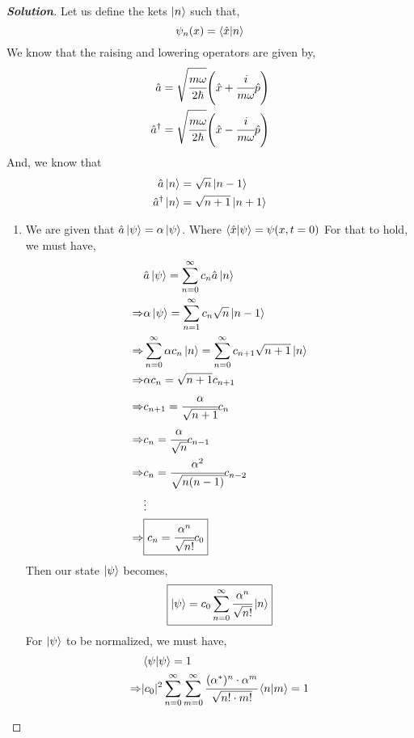 \documentclass[10pt]{scrartcl}
\theoremstyle{definition}
\newenvironment{solution} {\begin{proof}[\normalfont \textbf{Solution}]} {\end{proof}}
\newcommand*{\Op}{\hat{p}}
\newcommand*{\Ox}{\hat{x}}
\newcommand*{\Oa}{\hat{a}}
\begin{document}
\begin{solution}
    Let us define the kets $\ket{n}$ such that, $$\psi_n(x) = \ip{\Ox}{n}$$ We know that the raising
    and lowering operators are given by,
    \begin{align*}
        \Oa &= \sqrt{\cfrac{m\omega}{2\hbar}}\qty(\Ox + \cfrac{i}{m\omega}\Op) \\
        \Oa^\dagger &= \sqrt{\cfrac{m\omega}{2\hbar}}\qty(\Ox - \cfrac{i}{m\omega}\Op)
    \end{align*}
    And, we know that 
    \begin{align*}
        \Oa \ket{n} &= \sqrt{n}\ket{n - 1} \\
        \Oa^\dagger \ket{n} &= \sqrt{n + 1}\ket{n + 1}
    \end{align*}
    \begin{enumerate}[label=(\alph*)]
        \item We are given that $\Oa \ket{\psi} = \alpha \ket{\psi}$. Where $\ip{\Ox}{\psi} = \psi(x, t = 0)$ For that to hold, we must have, 
            \begin{align*}
                &\Oa\ket{\psi} = \sum_{n = 0}^{\infty} c_n \Oa \ket{n} \\
                \Rightarrow &\alpha \ket{\psi} = \sum_{n = 1}^{\infty} c_n \sqrt{n} \ket{n - 1} \\
                \Rightarrow &\sum_{n = 0}^{\infty} \alpha c_n \ket{n} = \sum_{n = 0}^{\infty} c_{n + 1} \sqrt{n + 1} \ket{n} \\ 
                \Rightarrow &\alpha c_n = \sqrt{n + 1} c_{n + 1} \\
                \Rightarrow &c_{n + 1} = \cfrac{\alpha}{\sqrt{n + 1}} c_{n}\\
                \Rightarrow &c_{n} = \cfrac{\alpha}{\sqrt{n}}c_{n - 1} \\
                \Rightarrow &c_{n} = \cfrac{\alpha^2}{\sqrt{n(n-1)}} c_{n - 2}\\
                            &\vdots \\
                \Rightarrow &\boxed{c_n = \cfrac{\alpha^n}{\sqrt{n!}}c_0}
            \end{align*}
            Then our state $\ket{\psi}$ becomes, $$\boxed{\ket{\psi} = c_0 \sum_{n = 0}^{\infty} \cfrac{\alpha^n}{\sqrt{n!}} \ket{n}}$$
            For $\ket\psi$ to be normalized, we must have,
            \begin{align*}
                &\ip{\psi}{\psi} = 1 \\ 
                \Rightarrow &|c_0|^2 \sum_{n = 0}^{\infty} \sum_{m = 0}^{\infty} \cfrac{(\alpha^*)^n \cdot \alpha^m}{\sqrt{n! \cdot m!}} \ip{n}{m}  = 1\\

\end{align*}
\end{enumerate}
\end{solution}
\end{document}
